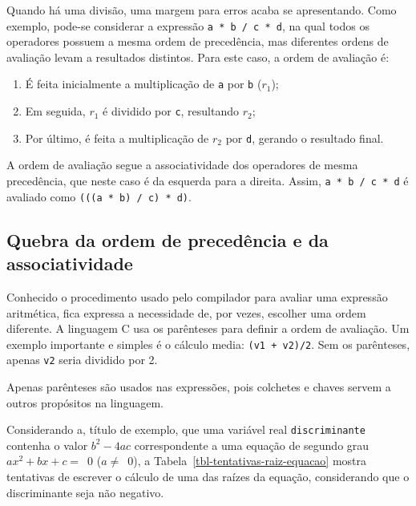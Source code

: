 \documentclass[
  11pt,
  a4paper,
]{scrbook}
\providecommand{\tightlist}{%
  \setlength{\itemsep}{0pt}\setlength{\parskip}{0pt}}\usepackage{longtable,booktabs,array}
\begin{document}
Quando há uma divisão, uma margem para erros acaba se apresentando. Como
exemplo, pode-se considerar a expressão \texttt{a\ *\ b\ /\ c\ *\ d}, na
qual todos os operadores possuem a mesma ordem de precedência, mas
diferentes ordens de avaliação levam a resultados distintos. Para este
caso, a ordem de avaliação é:

\begin{enumerate}
\tightlist
\item
  É feita inicialmente a multiplicação de \texttt{a} por \texttt{b}
  (\(r_1\));
\item
  Em seguida, \(r_1\) é dividido por \texttt{c}, resultando \(r_2\);
\item
  Por último, é feita a multiplicação de \(r_2\) por \texttt{d}, gerando
  o resultado final.
\end{enumerate}

A ordem de avaliação segue a associatividade dos operadores de mesma
precedência, que neste caso é da esquerda para a direita. Assim,
\texttt{a\ *\ b\ /\ c\ *\ d} é avaliado como
\texttt{(((a\ *\ b)\ /\ c)\ *\ d)}.

\subsection{Quebra da ordem de precedência e da
associatividade}\label{quebra-da-ordem-de-preceduxeancia-e-da-associatividade}

Conhecido o procedimento usado pelo compilador para avaliar uma
expressão aritmética, fica expressa a necessidade de, por vezes,
escolher uma ordem diferente. A linguagem C usa os parênteses para
definir a ordem de avaliação. Um exemplo importante e simples é o
cálculo media: \texttt{(v1\ +\ v2)/2}. Sem os parênteses, apenas
\texttt{v2} seria dividido por 2.

Apenas parênteses são usados nas expressões, pois colchetes e chaves
servem a outros propósitos na linguagem.

Considerando a, título de exemplo, que uma variável real
\texttt{discriminante} contenha o valor \(b^2 - 4ac\) correspondente a
uma equação de segundo grau \({ax^2 + bx + c = {}}\)~0 (\(a \neq\)~0), a
Tabela~\ref{tbl-tentativas-raiz-equacao} mostra tentativas de escrever o
cálculo de uma das raízes da equação, considerando que o discriminante
seja não negativo.
\end{document}
